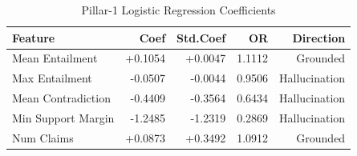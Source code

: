 \begin{table}[h]
  \centering
  \caption{Pillar-1 Logistic Regression Coefficients}
  \label{tab:pillar1_coeff}
  \begin{tabular}{lrrrr}
    \hline
    \textbf{Feature} & \textbf{Coef} & \textbf{Std.Coef} & \textbf{OR} & \textbf{Direction} \\
    \hline
    Mean Entailment & +0.1054 & +0.0047 & 1.1112 & Grounded \\
    Max Entailment & -0.0507 & -0.0044 & 0.9506 & Hallucination \\
    Mean Contradiction & -0.4409 & -0.3564 & 0.6434 & Hallucination \\
    Min Support Margin & -1.2485 & -1.2319 & 0.2869 & Hallucination \\
    Num Claims & +0.0873 & +0.3492 & 1.0912 & Grounded \\
    \hline
  \end{tabular}
\end{table}